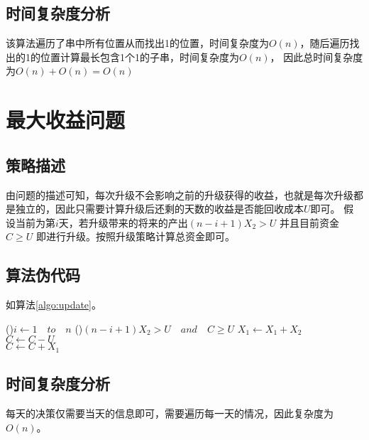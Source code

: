 \subsection{时间复杂度分析}

该算法遍历了串中所有位置从而找出1的位置，时间复杂度为$O(n)$，随后遍历找出的1的位置计算最长包含1个1的子串，时间复杂度为$O(n)$， 
因此总时间复杂度为$O(n) + O(n) = O(n)$


\section{最大收益问题}
\subsection{策略描述}

由问题的描述可知，每次升级不会影响之前的升级获得的收益，也就是每次升级都是独立的，因此只需要计算升级后还剩的天数的收益是否能回收成本$U$即可。
假设当前为第$i$天，若升级带来的将来的产出$(n-i+1)X_2 > U $ 并且目前资金 $C \ge U $ 即进行升级。按照升级策略计算总资金即可。

\subsection{算法伪代码}

如算法\ref{algo:update}。

\begin{algorithm}[H]
    \caption{$update(X_1, X_2, U, C, n)$}\label{algo:update}
    
    \For(){$i \leftarrow 1 \quad to \quad n$}{
        \If(){$(n-i+1)X_2 > U \quad and \quad C \ge U$}{
            $X_1 \leftarrow X_1 + X_2$\\
            $C \leftarrow C - U$\\
        }
        $C \leftarrow C + X_1$\\
    }
\end{algorithm}

\subsection{时间复杂度分析}
每天的决策仅需要当天的信息即可，需要遍历每一天的情况，因此复杂度为$O(n)$。

